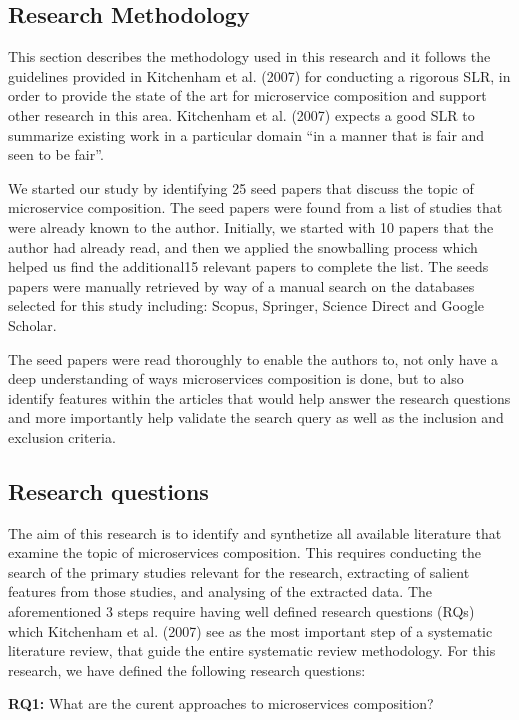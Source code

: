 \documentclass{article}
\begin{document}
\begin{multicols}{2}
\section{Research Methodology}

This section describes the methodology used in this research and it follows the guidelines provided in Kitchenham et al. (2007) for conducting a rigorous SLR, in order to provide the state of the art for microservice composition and support other research in this area. Kitchenham et al. (2007) expects a good SLR to summarize existing work in a particular domain “in a manner that is fair and seen to be fair”.

We started our study by identifying 25 seed papers that discuss the topic of microservice composition. The seed papers were found from a list of studies that were already known to the author. Initially, we started with 10 papers that the author had already read, and then we applied the snowballing process which helped us find the additional15 relevant papers to complete the list. The seeds papers were manually retrieved by way of a manual search on the databases selected for this study including: Scopus, Springer, Science Direct and Google Scholar.

The seed papers were read thoroughly to enable the authors to, not only have a deep understanding of ways microservices composition is done, but to also identify features within the articles that would help answer the research questions and more importantly help validate the search query as well as the inclusion and exclusion criteria. 

\subsection{Research questions}

The aim of this research is to identify and synthetize all available literature that examine the topic of microservices composition. This requires conducting the search of the primary studies relevant for the research, extracting of salient features from those studies, and analysing of the extracted data. The aforementioned 3 steps require having well defined research questions (RQs) which Kitchenham et al. (2007) see as the most important step of a systematic literature review, that guide the entire systematic review methodology. For this research, we have defined the following research questions:

\textbf{RQ1:} What are the curent approaches to microservices composition?


\end{multicols}
\end{document}
